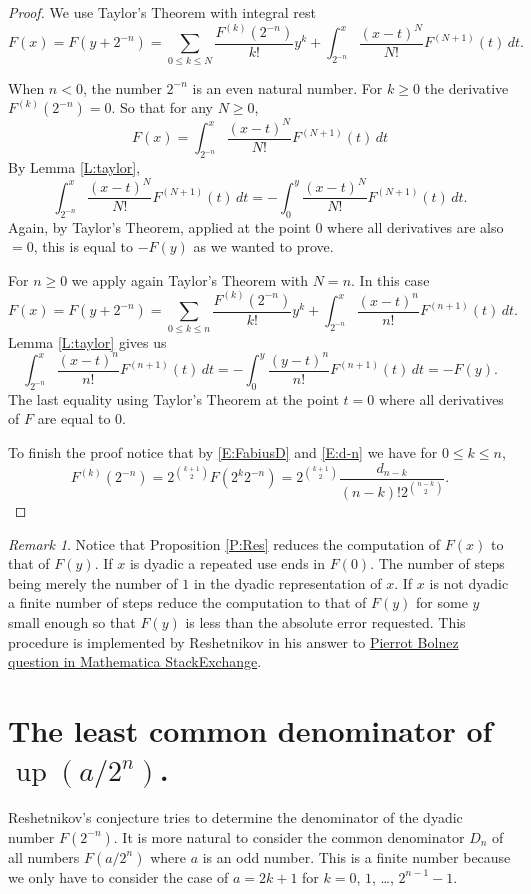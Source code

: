 \documentclass[10pt]{amsart}
\theoremstyle{definition}
\theoremstyle{remark}
\newtheorem{rem}[thm]{Remark}
\DeclareMathOperator\up{up}
\begin{document}
\begin{proof}
We use Taylor's Theorem with integral rest 
\[F(x)=F(y+2^{-n})=\sum_{0\le k\le N}\frac{F^{(k)}(2^{-n})}{k!}y^k+\int_{2^{-n}}^x\frac{(x-t)^N}{N!} F^{(N+1)}(t)\,dt.\]

When $n<0$, the number $2^{-n}$ is an even natural number. For $k\ge0$ the derivative $F^{(k)}(2^{-n})=0$. So that for 
any $N\ge0$, 
\[F(x)=\int_{2^{-n}}^x\frac{(x-t)^N}{N!} F^{(N+1)}(t)\,dt\]
By Lemma \eqref{L:taylor},
\[\int_{2^{-n}}^x\frac{(x-t)^N}{N!} F^{(N+1)}(t)\,dt=-\int_{0}^y\frac{(x-t)^N}{N!} F^{(N+1)}(t)\,dt.\]
Again, by Taylor's Theorem, applied at the point $0$ where all derivatives are also $=0$,  
this is equal to $-F(y)$ as we wanted to prove. 

For $n\ge0$ we apply again Taylor's Theorem with $N=n$.  In this case
\[F(x)=F(y+2^{-n})=\sum_{0\le k\le n}\frac{F^{(k)}(2^{-n})}{k!}y^k+\int_{2^{-n}}^x\frac{(x-t)^n}{n!} F^{(n+1)}(t)\,dt.\]
Lemma \eqref{L:taylor} gives us 
\[\int_{2^{-n}}^x\frac{(x-t)^n}{n!} F^{(n+1)}(t)\,dt=-\int_0^y \frac{(y-t)^n}{n!} F^{(n+1)}(t)\,dt=-F(y).\]
The last equality using Taylor's Theorem at the point $t=0$ where all derivatives of $F$ are equal to $0$. 

To finish the proof notice that by \eqref{E:FabiusD} and \eqref{E:d-n} we have for $0\le k\le n$,
\[F^{(k)}(2^{-n})=2^{\binom{k+1}{2}}F(2^k 2^{-n})=2^{\binom{k+1}{2}}\frac{d_{n-k}}{(n-k)! 2^{\binom{n-k}{2}}}.\]
\end{proof}

\begin{rem}
Notice that  Proposition \ref{P:Res} reduces the computation of $F(x)$  to that of $F(y)$. 
If $x$ is dyadic a repeated use ends in $F(0)$. The number of steps being merely the number of $1$ 
in the  dyadic representation of $x$.  If $x$ is not dyadic a finite number of steps reduce the computation to that 
of  $F(y)$ for some $y$ small enough so that  $F(y)$ is less than the absolute error requested. 
This procedure is implemented by Reshetnikov in his answer to \href{http://mathematica.stackexchange.com/questions/120331/how-do-i-numerically-evaluate-and-plot-the-fabius-function}{Pierrot Bolnez question in Mathematica StackExchange}.
\end{rem}

\section{The least common denominator of $\up(a/2^n)$.}

Reshetnikov's conjecture tries to determine the denominator of the dyadic number $F(2^{-n})$.  It is more natural to 
consider the common denominator $D_n$ of all numbers $F(a/2^n)$ where $a$ is an odd number. This is a finite number
because we only have to consider the case of $a=2k+1$ for $k=0$, $1$, \dots, $2^{n-1}-1$.  
\end{document}
